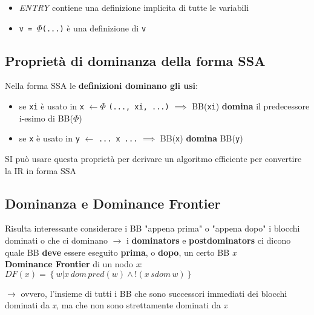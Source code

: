 \begin{emphasize}[frametitle={Note}]
  \begin{itemize}
    \item\textit{ENTRY} contiene una definizione implicita di tutte le variabili
    \item\lstinline|v = |$\Phi$\lstinline|(...)| \`e una definizione di \lstinline|v|
\end{itemize}
\end{emphasize}

\subsection{Propriet\`a di dominanza della forma SSA}

Nella forma SSA le \textbf{definizioni dominano gli usi}:
\begin{itemize}
  \item se \lstinline|xi| \`e usato in \lstinline|x| $\leftarrow \Phi$ \lstinline|(..., xi, ...)| $\implies$ BB(\lstinline|xi|) \textbf{domina} il predecessore i-esimo di BB($\Phi$)
  \item se \lstinline|x| \`e usato in \lstinline|y| $\leftarrow$ \lstinline|... x ...| $\implies$ BB(\lstinline|x|) \textbf{domina} BB(\lstinline|y|)
\end{itemize}

SI pu\`o usare questa propriet\`a per derivare un algoritmo efficiente per convertire la IR in forma SSA

\subsection{Dominanza e Dominance Frontier}

Risulta interessante considerare i BB "appena prima" o "appena dopo" i blocchi dominati o che ci dominano $\rightarrow$ i \textbf{dominators} e \textbf{postdominators} ci dicono quale BB \textbf{deve} essere eseguito \textbf{prima}, o \textbf{dopo}, un certo BB \textit{x}\\

\noindent\textbf{Dominance Frontier} di un nodo \textit{x}: $\boxed{DF(x) = \left\lbrace w | x\, dom\, pred(w) \land !(x\, sdom\, w)\right\rbrace}$

\noindent $\rightarrow$ ovvero, l'insieme di tutti i BB che sono successori immediati dei blocchi dominati da \textit{x}, ma che non sono strettamente dominati da \textit{x}

